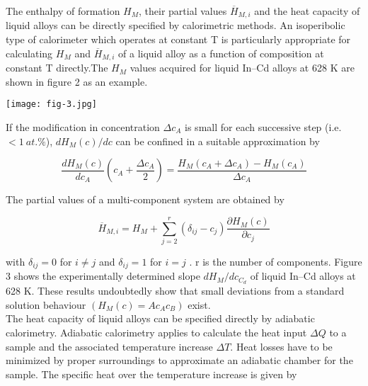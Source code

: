 \documentclass[12pt]{article}
\newcommand*{\1}{\hspace{1pt}}
\begin{document}
    The enthalpy of formation $ H _M $, their partial values  $ \overline{H} _{M,i} $
    and the heat capacity of liquid alloys can be directly specified by calorimetric methods.
    An isoperibolic type of calorimeter which operates at constant T is particularly appropriate for
    calculating $H _M $ and $ \overline{H} _{M,i} $ of a liquid alloy as a function of composition 
    at constant T directly.The $ H _M $ values acquired for liquid In–Cd alloys at 628 K are
    shown in figure 2 as an example.
    \begin{adjustbox}{center,caption={Enthalpy of mixing of liquid Cd–In alloys.},label={somelabel},nofloat=figure,vspace=\bigskipamount}
        \texttt{[image: fig-3.jpg]}
    \end{adjustbox}

    If the modification in concentration $ \Delta c _A $ is small for each successive step (i.e. $ <  1 \ at.\% $),
    $ dH _M (c)/dc $ can be confined in a suitable approximation by


        \begin{equation}
        \frac{ dH _M (c)}{dc _A} \left(c _A + \frac{\Delta c _A}{2} \right) = \frac{H _M 
        (c _A + \Delta c _A )-H _M (c _A)}{\Delta c _A } 
        \end{equation} 

    The partial values of a multi-component system are obtained by

        \begin{equation}
            \overline{H} _{M,i} = H _M + \sum_{j = 2}^{r} (\delta _{ij} - c _j)\frac{\partial H _M{(c)}}{\partial c _j}   
        \end{equation} 

    with $ \delta  _{ij} =0 $ for $i \neq  j$ and $ \delta  _{ij} =1 $ for $i = j$ . r is the 
    number of components. Figure 3 shows the experimentally determined slope $ d H _M / dc _{C _d} $ 
    of liquid In–Cd alloys at 628 K. These results undoubtedly show that small deviations from a standard solution behaviour $ (H _M (c) = Ac _Ac _B) $
    exist.\cite{s3} \\

    The heat capacity of liquid alloys can be specified directly by adiabatic calorimetry.
    Adiabatic calorimetry applies to calculate the heat input $ \Delta Q $ to a sample and the 
    associated temperature increase $ \Delta T $.
    Heat losses have to be minimized by proper surroundings to approximate an adiabatic
    chamber for the sample. The specific heat over the temperature increase is given by 
\end{document}
